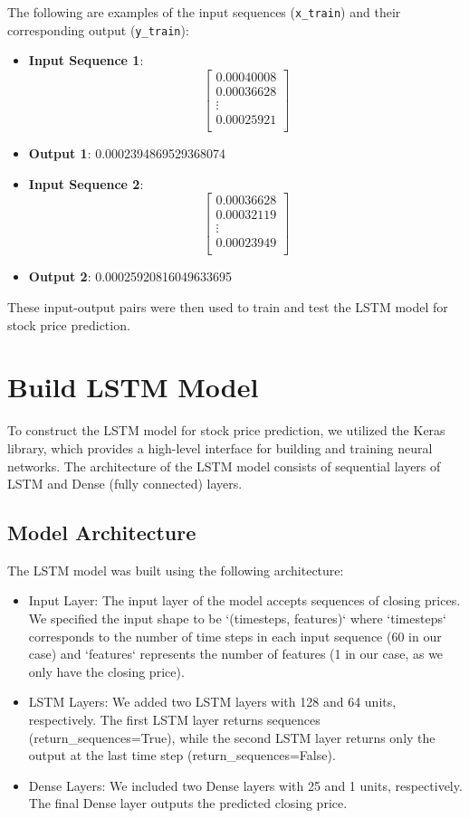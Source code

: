 \documentclass[10pt,twocolumn,letterpaper]{article}
\begin{document}
The following are examples of the input sequences (\texttt{x\_train}) and their corresponding 
output (\texttt{y\_train}):
\begin{itemize}
    \item \textbf{Input Sequence 1}:
    \[
    \begin{bmatrix}
    0.00040008 \\
    0.00036628 \\
    \vdots \\
    0.00025921 \\
    \end{bmatrix}
    \]
    \item \textbf{Output 1}: 0.0002394869529368074
    \item \textbf{Input Sequence 2}:
    \[
    \begin{bmatrix}
    0.00036628 \\
    0.00032119 \\
    \vdots \\
    0.00023949 \\
    \end{bmatrix}
    \]
    \item \textbf{Output 2}: 0.00025920816049633695
\end{itemize}
These input-output pairs were then used to train and test the LSTM model for stock price prediction.

\section{Build LSTM Model}
\label{sec:build-lstm-model}
To construct the LSTM model for stock price  prediction, we utilized the 
Keras library, which provides a high-level interface for building and 
training neural networks. The architecture of the LSTM model consists 
of sequential layers of LSTM and Dense (fully connected) layers.

\subsection{Model Architecture}
The LSTM model was built using the following architecture:
\begin{itemize}
    \item Input Layer: The input layer of the model accepts sequences of closing prices. 
We specified the input shape to be `(timesteps, features)` where `timesteps` corresponds 
to the number of time steps in each input sequence (60 in our case) and `features` 
represents the number of features (1 in our case, as we only have the closing price).
    \item LSTM Layers: We added two LSTM layers with 128 and 64 units, respectively. 
The first LSTM layer returns sequences (return\_sequences=True), while the second 
LSTM layer returns only the output at the last time step (return\_sequences=False).
    \item Dense Layers: We included two Dense layers with 25 and 1 units, respectively. 
The final Dense layer outputs the predicted closing price.
\end{itemize}
\end{document}
